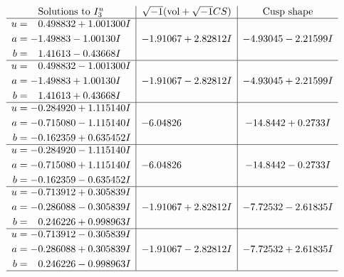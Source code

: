 \documentclass[1p]{elsarticle_modified}
\theoremstyle{definition}
\newcommand{\I}{\sqrt{-1}}
\begin{document}
$$\begin{array}{c|c|c}  
\text{Solutions to }I^u_{3}& \I (\text{vol} + \sqrt{-1}CS) & \text{Cusp shape}\\
 \hline 
\begin{aligned}
u &= \phantom{-}0.498832 + 1.001300 I \\
a &= -1.49883 - 1.00130 I \\
b &= \phantom{-}1.41613 - 0.43668 I\end{aligned}
 & -1.91067 + 2.82812 I & -4.93045 - 2.21599 I \\ \hline\begin{aligned}
u &= \phantom{-}0.498832 - 1.001300 I \\
a &= -1.49883 + 1.00130 I \\
b &= \phantom{-}1.41613 + 0.43668 I\end{aligned}
 & -1.91067 - 2.82812 I & -4.93045 + 2.21599 I \\ \hline\begin{aligned}
u &= -0.284920 + 1.115140 I \\
a &= -0.715080 - 1.115140 I \\
b &= -0.162359 + 0.635452 I\end{aligned}
 & -6.04826\phantom{ +0.000000I} & -14.8442 + 0.2733 I \\ \hline\begin{aligned}
u &= -0.284920 - 1.115140 I \\
a &= -0.715080 + 1.115140 I \\
b &= -0.162359 - 0.635452 I\end{aligned}
 & -6.04826\phantom{ +0.000000I} & -14.8442 - 0.2733 I \\ \hline\begin{aligned}
u &= -0.713912 + 0.305839 I \\
a &= -0.286088 - 0.305839 I \\
b &= \phantom{-}0.246226 + 0.998963 I\end{aligned}
 & -1.91067 + 2.82812 I & -7.72532 - 2.61835 I \\ \hline\begin{aligned}
u &= -0.713912 - 0.305839 I \\
a &= -0.286088 + 0.305839 I \\
b &= \phantom{-}0.246226 - 0.998963 I\end{aligned}
 & -1.91067 - 2.82812 I & -7.72532 + 2.61835 I\\
 \hline 
 \end{array}$$\newpage
\newpage\renewcommand{\arraystretch}{1}
\end{document}
